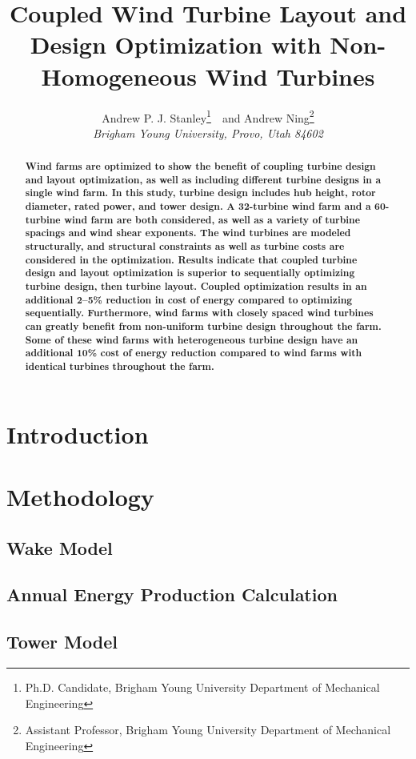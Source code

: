 \documentclass[]{aiaa-tc}
\title{Coupled Wind Turbine Layout and Design Optimization with Non-Homogeneous Wind Turbines}
\author{
  Andrew P. J. Stanley\thanks{Ph.D. Candidate, Brigham Young University Department of Mechanical Engineering}\ \ and Andrew Ning\thanks{Assistant Professor, Brigham Young University Department of Mechanical Engineering}
  \\
  \smallskip
                         {\normalsize\itshape
   Brigham Young University, Provo, Utah 84602}\\}
\begin{document}
\maketitle{}
\begin{abstract}
\textbf{Wind farms are optimized to show the benefit of coupling turbine design and layout optimization, as well as including different turbine designs in a single wind farm. In this study, turbine design includes hub height, rotor diameter, rated power, and tower design. A 32-turbine wind farm and a 60-turbine wind farm are both considered, as well as a variety of turbine spacings and wind shear exponents. The wind turbines are modeled structurally, and structural constraints as well as turbine costs are considered in the optimization. Results indicate that coupled turbine design and layout optimization is superior to sequentially optimizing turbine design, then turbine layout. Coupled optimization results in an additional  2--5\% reduction in cost of energy compared to optimizing sequentially. Furthermore, wind farms with closely spaced wind turbines can greatly benefit from non-uniform turbine design throughout the farm. Some of these wind farms with heterogeneous turbine design have an additional 10\% cost of energy reduction compared to wind farms with identical turbines throughout the farm. }
\end{abstract}


\section{Introduction}





\section{Methodology}

\subsection{Wake Model}

      
\subsection{Annual Energy Production Calculation}


\subsection{Tower Model}

\end{document}
